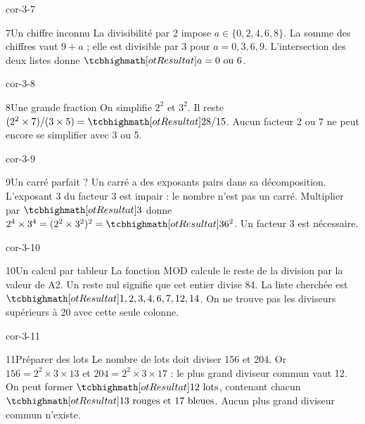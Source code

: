 \begin{blocLivre}{cor-3-7}\begin{corrige}{7}{Un chiffre inconnu}
La divisibilité par 2 impose $a\in\{0,2,4,6,8\}$. La somme des chiffres vaut $9+a$ ; elle est divisible par 3 pour $a=0,3,6,9$. L’intersection des deux listes donne $\res{a=0\text{ ou }6}$.
\end{corrige}\end{blocLivre}
\begin{blocLivre}{cor-3-8}\begin{corrige}{8}{Une grande fraction}
On simplifie $2^2$ et $3^2$. Il reste $(2^2\times7)/(3\times5)=\res{28/15}$. Aucun facteur 2 ou 7 ne peut encore se simplifier avec 3 ou 5.
\end{corrige}\end{blocLivre}
\begin{blocLivre}{cor-3-9}\begin{corrige}{9}{Un carré parfait ?}
Un carré a des exposants pairs dans sa décomposition. L’exposant 3 du facteur 3 est impair : le nombre n’est pas un carré. Multiplier par $\res3$ donne $2^4\times3^4=(2^2\times3^2)^2=\res{36^2}$. Un facteur 3 est nécessaire.
\end{corrige}\end{blocLivre}
\begin{blocLivre}{cor-3-10}\begin{corrige}{10}{Un calcul par tableur}
La fonction MOD calcule le reste de la division par la valeur de A2. Un reste nul signifie que cet entier divise 84. La liste cherchée est $\res{1,2,3,4,6,7,12,14}$. On ne trouve pas les diviseurs supérieurs à 20 avec cette seule colonne.
\end{corrige}\end{blocLivre}
\begin{blocLivre}{cor-3-11}\begin{corrige}{11}{Préparer des lots}
Le nombre de lots doit diviser 156 et 204. Or $156=2^2\times3\times13$ et $204=2^2\times3\times17$ : le plus grand diviseur commun vaut 12. On peut former $\res{12\text{ lots}}$, contenant chacun $\res{13\text{ rouges et }17\text{ bleues}}$. Aucun plus grand diviseur commun n’existe.
\end{corrige}\end{blocLivre}
